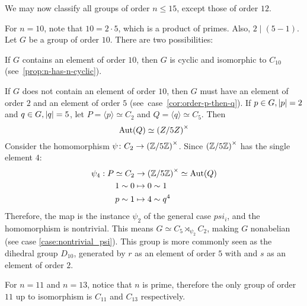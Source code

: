 We may now classify all groups of order $n \le 15$, except those of order $12$.

For $n = 10$, note that $10 = 2 \cdot 5$, which is a product of primes.
Also, $2 \mid (5 - 1)$.
Let $G$ be a group of order $10$.
There are two possibilities:
\begin{enumalph}
  \item If $G$ contains an element of order $10$, then $G$ is cyclic and
    isomorphic to $C_{10}$ (see~\ref{prop:n-has-n-cyclic}).
  \item If $G$ does not contain an element of order $10$,
    then $G$ must have an element of order $2$ and an element of order $5$
    (see~case~\ref{cor:order-p-then-q}).
    If $p \in G, \lvert p\rvert = 2$ and $q \in G, \lvert q\rvert = 5$,
    let $P = \langle p \rangle \simeq C_2$ and $Q = \langle q \rangle \simeq C_5$.
    Then  \[ \operatorname{Aut}(Q) \simeq {(Z/5Z)}^\times \]
    Consider the homomorphism $\psi \colon C_2 \to {(\mathbb{Z}/5\mathbb{Z})}^\times$.
    Since ${(\mathbb{Z}/5\mathbb{Z})}^\times$ has the single element $4$:
    \begin{align*}
      \psi_4 : P \simeq C_2 &\to {(\mathbb{Z}/5\mathbb{Z})}^\times \simeq \operatorname{Aut}(Q) \\
              1 \sim 0 &\mapsto 0 \sim 1 \\
              p \sim 1 &\mapsto 4 \sim q^4 \\
    \end{align*}
    Therefore, the map is the instance $\psi_2$ of the general case $psi_i$,
    and the homomorphism is nontrivial.
    This means $G \simeq C_5 \rtimes_{\psi_2} C_2$, making $G$ nonabelian
    (see case \ref{case:nontrivial_psi}).
    This group is more commonly seen as the dihedral group $D_{10}$,
    generated by $r$ as an element of order $5$ with
    and $s$ as an element of order $2$.
\end{enumalph}

For $n = 11$ and $n = 13$, notice that $n$ is prime, therefore the only group of order $11$
up to isomorphism is $C_{11}$ and $C_13$ respectively.

